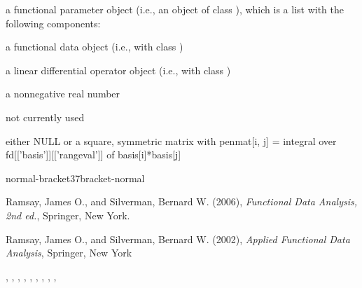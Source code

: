 \documentclass{article}
\begin{document}
\begin{Value}
a functional parameter object (i.e., an object of class ),
which is a list with the following components:

\begin{ldescription}
\item[\code{fd}] a functional data object (i.e., with class )

\item[\code{Lfd}] a linear differential operator object (i.e., with class
)

\item[\code{lambda}] a nonnegative real number

\item[\code{estimate}] not currently used
\item[\code{penmat}] either NULL or a square, symmetric matrix with penmat[i, j] =
integral over fd[['basis']][['rangeval']] of basis[i]*basis[j]

\end{ldescription}

normal-bracket37bracket-normal
\end{Value}
\begin{Source}\relax
Ramsay, James O., and Silverman, Bernard W. (2006), \emph{Functional
Data Analysis, 2nd ed.}, Springer, New York.

Ramsay, James O., and Silverman, Bernard W. (2002), \emph{Applied
Functional Data Analysis}, Springer, New York
\end{Source}
\begin{SeeAlso}\relax
{},
,
,
,
,
,
,
,
,
\end{SeeAlso}
\end{document}
